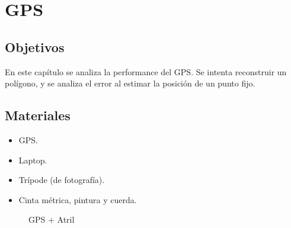 \documentclass[main]{subfiles}
\begin{document}
\chapter{GPS}
\label{chap-gps}

\section{Objetivos}

En este capítulo se analiza la performance del GPS. Se intenta reconstruir un polígono, y se analiza el error al estimar la posición de un punto fijo.

\section{Materiales}

\begin{itemize}
\item GPS.
\item Laptop.
\item Trípode (de fotografía).
\item Cinta métrica, pintura y cuerda.
\end{itemize}

\begin{figure} [h!]
  \vspace{-20pt}
  \centering
  \caption{GPS + Atril}
  \label{fig:rebotes}
  \vspace{-50pt}
\end{figure}
\end{document}
